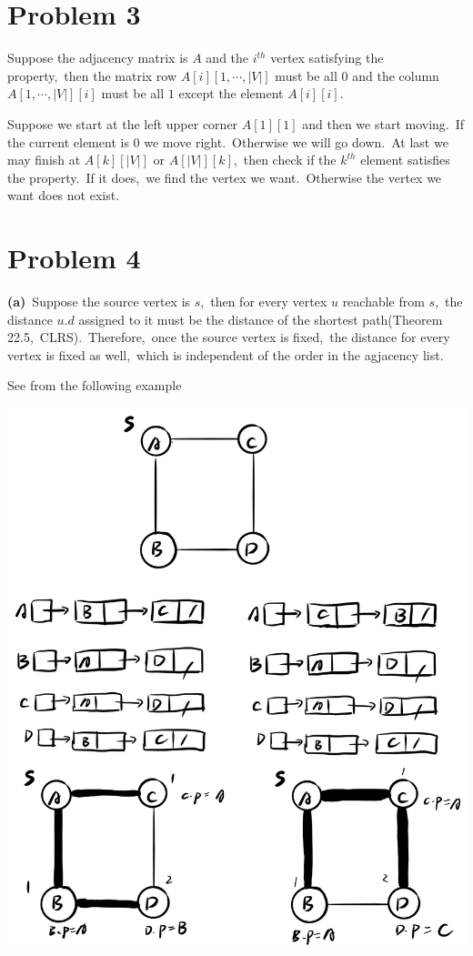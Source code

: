 \documentclass[]{article}
\begin{document}
	\section{Problem 3}
	Suppose the adjacency matrix is $A$ and the $i^{th}$ vertex satisfying the property,\ then the matrix row $A[i][1,\cdots,|V|]$ must be all $0$ and the column $A[1,\cdots,|V|][i]$ must be all $1$ except the element $A[i][i]$.
	
	Suppose we start at the left upper corner $A[1][1]$ and then we start moving.\ If the current element is $0$ we move right.\ Otherwise we will go down.\ At last we may finish at $A[k][|V|]$ or $A[|V|][k]$,\ then check if the $k^{th}$ element satisfies the property.\ If it does,\ we find the vertex we want.\ Otherwise the vertex we want does not exist.
	
	\section{Problem 4}
	\textbf{(a)}\ Suppose the source vertex is $s$,\ then for every vertex $u$ reachable from $s$,\ the distance $u.d$ assigned to it must be the distance of the shortest path(Theorem 22.5,\ CLRS).\ Therefore,\ once the source vertex is fixed,\ the distance for every vertex is fixed as well,\ which is independent of the order in the agjacency list.
	
	See from the following example
	
	\includegraphics[width=.9\textwidth]{1.png}
	
\end{document}
